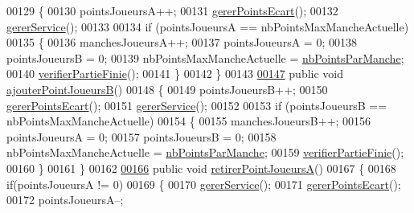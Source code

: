 \begin{DoxyCode}
00129     \{
00130         pointsJoueursA++;
00131         \hyperlink{classcom_1_1example_1_1area_1_1_partie_a2838da99f206d736a22f8a3f271365b2}{gererPointsEcart}();
00132         \hyperlink{classcom_1_1example_1_1area_1_1_partie_a52c8e133b23468d4b2c4338a80c3763c}{gererService}();
00133 
00134         \textcolor{keywordflow}{if} (pointsJoueursA == nbPointsMaxMancheActuelle)
00135         \{
00136             manchesJoueursA++;
00137             pointsJoueursA = 0;
00138             pointsJoueursB = 0;
00139             nbPointsMaxMancheActuelle = \hyperlink{classcom_1_1example_1_1area_1_1_partie_a23cd7e19042eece7057f810bba2f4f2c}{nbPointsParManche};
00140             \hyperlink{classcom_1_1example_1_1area_1_1_partie_ad07c65c2ba36cd08798cee1ba6b99c81}{verifierPartieFinie}();
00141         \}
00142     \}
00143 
\hyperlink{classcom_1_1example_1_1area_1_1_partie_aadc82cc11b982008b81f886adbc4e63a}{00147}     \textcolor{keyword}{public} \textcolor{keywordtype}{void} \hyperlink{classcom_1_1example_1_1area_1_1_partie_aadc82cc11b982008b81f886adbc4e63a}{ajouterPointJoueursB}()
00148     \{
00149         pointsJoueursB++;
00150         \hyperlink{classcom_1_1example_1_1area_1_1_partie_a2838da99f206d736a22f8a3f271365b2}{gererPointsEcart}();
00151         \hyperlink{classcom_1_1example_1_1area_1_1_partie_a52c8e133b23468d4b2c4338a80c3763c}{gererService}();
00152 
00153         \textcolor{keywordflow}{if} (pointsJoueursB == nbPointsMaxMancheActuelle)
00154         \{
00155             manchesJoueursB++;
00156             pointsJoueursA = 0;
00157             pointsJoueursB = 0;
00158             nbPointsMaxMancheActuelle = \hyperlink{classcom_1_1example_1_1area_1_1_partie_a23cd7e19042eece7057f810bba2f4f2c}{nbPointsParManche};
00159             \hyperlink{classcom_1_1example_1_1area_1_1_partie_ad07c65c2ba36cd08798cee1ba6b99c81}{verifierPartieFinie}();
00160         \}
00161     \}
00162 
\hyperlink{classcom_1_1example_1_1area_1_1_partie_a2847b07aff035a02c130f6219efc5312}{00166}     \textcolor{keyword}{public} \textcolor{keywordtype}{void} \hyperlink{classcom_1_1example_1_1area_1_1_partie_a2847b07aff035a02c130f6219efc5312}{retirerPointJoueursA}()
00167     \{
00168         \textcolor{keywordflow}{if}(pointsJoueursA != 0)
00169         \{
00170             \hyperlink{classcom_1_1example_1_1area_1_1_partie_a52c8e133b23468d4b2c4338a80c3763c}{gererService}();
00171             \hyperlink{classcom_1_1example_1_1area_1_1_partie_a2838da99f206d736a22f8a3f271365b2}{gererPointsEcart}();
00172             pointsJoueursA--;

\end{DoxyCode}

